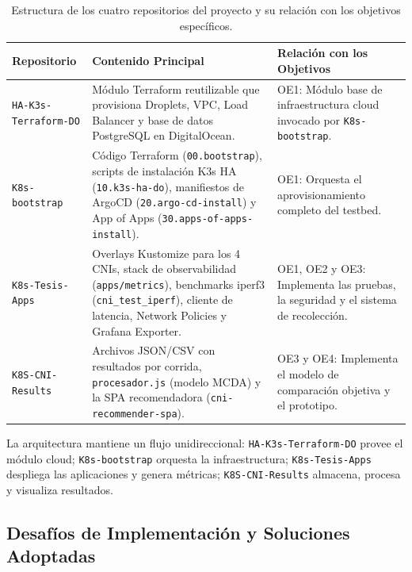 \begin{table}[htbp]
\centering
\scriptsize
\renewcommand{\arraystretch}{1.25}
\setlength{\tabcolsep}{4pt}
\caption{Estructura de los cuatro repositorios del proyecto y su relación con los objetivos específicos.}
\label{tab:repositorios-entregables}
\begin{tabularx}{\textwidth}{|p{3cm}|Y|p{5.2cm}|}
\hline
\textbf{Repositorio} & \textbf{Contenido Principal} & \textbf{Relación con los Objetivos} \\
\hline
\texttt{HA-K3s-Terraform-DO} & Módulo Terraform reutilizable que provisiona Droplets, VPC, Load Balancer y base de datos PostgreSQL en DigitalOcean. & OE1: Módulo base de infraestructura cloud invocado por \texttt{K8s-bootstrap}. \\
\hline
\texttt{K8s-bootstrap} & Código Terraform (\texttt{00.bootstrap}), scripts de instalación K3s HA (\texttt{10.k3s-ha-do}), manifiestos de ArgoCD (\texttt{20.argo-cd-install}) y App of Apps (\texttt{30.apps-of-apps-install}). & OE1: Orquesta el aprovisionamiento completo del testbed. \\
\hline
\texttt{K8s-Tesis-Apps} & Overlays Kustomize para los 4 CNIs, stack de observabilidad (\texttt{apps/metrics}), benchmarks iperf3 (\texttt{cni\_test\_iperf}), cliente de latencia, Network Policies y Grafana Exporter. & OE1, OE2 y OE3: Implementa las pruebas, la seguridad y el sistema de recolección. \\
\hline
\texttt{K8S-CNI-Results} & Archivos JSON/CSV con resultados por corrida, \texttt{procesador.js} (modelo MCDA) y la SPA recomendadora (\texttt{cni-recommender-spa}). & OE3 y OE4: Implementa el modelo de comparación objetiva y el prototipo. \\
\hline
\end{tabularx}
\end{table}

La arquitectura mantiene un flujo unidireccional: \texttt{HA-K3s-Terraform-DO} provee el módulo cloud; \texttt{K8s-bootstrap} orquesta la infraestructura; \texttt{K8s-Tesis-Apps} despliega las aplicaciones y genera métricas; \texttt{K8S-CNI-Results} almacena, procesa y visualiza resultados.

\subsection{Desafíos de Implementación y Soluciones Adoptadas}

